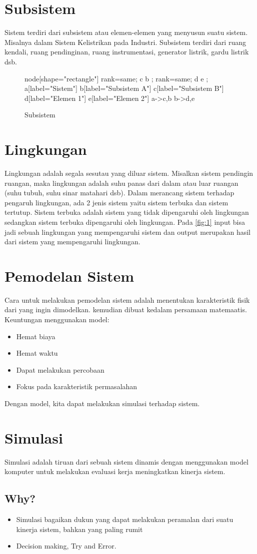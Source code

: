 \documentclass[10pt]{article}
\begin{document}
\section{Subsistem}
Sistem terdiri dari subsistem atau elemen-elemen yang menyusun suatu sistem. Misalnya dalam Sistem Kelistrikan pada Industri. Subsistem terdiri dari ruang kendali, ruang pendinginan, ruang instrumentasi, generator listrik, gardu listrik dsb.
\begin{figure}[!t]
    \centering
{} {
    node[shape="rectangle"]
    { rank=same; c b };
    { rank=same; d e };
a[label="Sistem"]
b[label="Subsistem A"]
c[label="Subsistem B"]
d[label="Elemen 1"]
e[label="Elemen 2"]
a->c,b 
b->d,e
}
\caption{Subsistem}
\label{fig:2}
\end{figure}

\section{Lingkungan}
Lingkungan adalah segala sesutau yang diluar sistem. Misalkan sistem pendingin ruangan, maka lingkungan adalah suhu panas dari dalam atau luar ruangan (suhu tubuh, suhu sinar matahari dsb).
Dalam merancang sistem terhadap pengaruh lingkungan, ada 2 jenis sistem yaitu sistem terbuka dan sistem tertutup. Sistem terbuka adalah sistem yang tidak dipengaruhi oleh lingkungan sedangkan sistem terbuka dipengaruhi oleh lingkungan.
Pada \figurename{\ref{fig:1}} input bisa jadi sebuah lingkungan yang mempengaruhi sistem dan output merupakan hasil dari sistem yang mempengaruhi lingkungan.
\section{Pemodelan Sistem}
Cara untuk melakukan pemodelan sistem adalah menentukan karakteristik fisik dari yang ingin dimodelkan. kemudian dibuat kedalam persamaan matemaatis.
Keuntungan menggunakan model:
\begin{itemize}
    \item Hemat biaya
    \item Hemat waktu
    \item Dapat melakukan percobaan
    \item Fokus pada karakteristik permasalahan
\end{itemize}
Dengan model, kita dapat melakukan simulasi terhadap sistem.
\section{Simulasi}
Simulasi adalah tiruan dari sebuah sistem dinamis dengan menggunakan model komputer untuk melakukan evaluasi kerja meningkatkan kinerja sistem.
\subsection{Why?}
\begin{itemize}
    \item Simulasi bagaikan dukun yang dapat melakukan peramalan dari suatu kinerja sistem, bahkan yang paling rumit
    \item Decision making, Try and Error.
\end{itemize}
\end{document}
